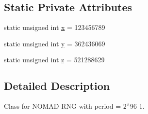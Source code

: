 \subsection*{Static Private Attributes}
\begin{DoxyCompactItemize}
\item 
static unsigned int \hyperlink{class_c_nomad_r_n_g_ac5867625fe6608450421de3166e38fd8}{x} = 123456789
\item 
static unsigned int \hyperlink{class_c_nomad_r_n_g_ae5ab3fef08b3818ae0b72d7f705cbb07}{y} = 362436069
\item 
static unsigned int \hyperlink{class_c_nomad_r_n_g_ad566dc723566cf9c6ec324b3ef1cc008}{z} = 521288629
\end{DoxyCompactItemize}


\subsection{Detailed Description}
Class for N\-O\-M\-A\-D R\-N\-G with period = 2$^\wedge$96-\/1. 

